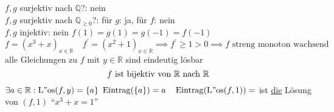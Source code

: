 \documentclass[a4paper, parskip = true, fleqn, headsepline = true]{scrartcl}
\newcommand{\Q}{\mathbb{Q}}
\newcommand{\R}{\mathbb{R}}
\begin{document}
\begin{example}[$ f \coloneqq (x^2)_{x \in \Q} \quad g \coloneqq (x^2)_{x \in \R}$]
	$ f, g $ surjektiv nach $ \Q $?: nein\\
	$ f, g $ surjektiv nach $ \Q_{\geq 0} $?: für $ g $: ja, für $ f $: nein\\
	$ f, g $ injektiv: nein $ f(1) = g(1) = g(-1) = f(-1) $\\
	$ f = ( x^3 + x )_{x \in \R} \quad f^{\prime} = ( x^2 + 1 )_{x \in \R} \implies f^{\prime} \geq 1 > 0 \implies f \text{ streng monoton wachsend} $\\
	alle Gleichungen zu $ f $ mit $ y \in \R $ sind eindeutig lösbar
	\[ f \text{ ist bijektiv von $ \R $ nach $ \R $} \]
	$ \exists a \in \R : \operatorname{L"os}(f, y) = \{ a \} $
	$ \operatorname{Eintrag}(\{ a \}) = a \quad \operatorname{Eintrag}(\operatorname{L"os}(f, 1)) = $ ist \underline{die} Lösung von $ (f, 1) $ ``$ x^3 + x = 1 $''\\[2pt]
\end{example}
\end{document}
